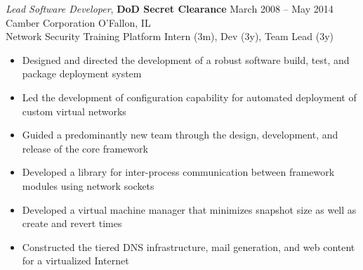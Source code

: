 \documentclass[margin,line]{resume}
\begin{document}
\begin{resume}
{\sl Lead Software Developer}, \textbf{\small DoD Secret Clearance}  \hfill  March 2008 -- May 2014\\
Camber Corporation                                                   \hfill  O'Fallon, IL\\
{\small Network Security Training Platform  \hfill  Intern (3m), Dev (3y), Team Lead (3y)}
\begin{itemize} \itemsep -2pt %
\small\item Designed and directed the development of a robust software build, test, and package deployment system
\small\item Led the development of configuration capability for automated deployment of custom virtual networks
\small\item Guided a predominantly new team through the design, development, and release of the core framework
\small\item Developed a library for inter-process communication between framework modules using network sockets
\small\item Developed a virtual machine manager that minimizes snapshot size as well as create and revert times
\small\item Constructed the tiered DNS infrastructure, mail generation, and web content for a virtualized Internet
\end{itemize}



\end{resume}
\end{document}
